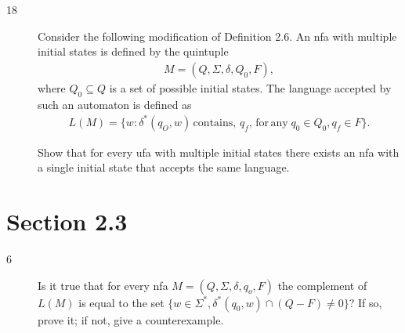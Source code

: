 \documentclass[12pt]{article}
\begin{document}
\begin{description}
    \item[18] Consider the following modification of Definition 2.6. An nfa
        with multiple initial states is defined by the quintuple
        \begin{align*}
            M = (Q, \Sigma, \delta, Q_0, F),
        \end{align*}
        where $Q_0 \subseteq Q$ is a set of possible initial states. The
        language accepted by such an automaton is defined as
        \begin{align*}
            L(M) = \{w: \delta^*(q_O,w)\, \mathrm{contains},\, q_f,\,
                     \mathrm{for\, any}\; q_0 \in Q_0, q_f \in F\}.
        \end{align*}

        Show that for every ufa with multiple initial states there exists an
        nfa with a single initial state that accepts the same language.
\end{description}

\section*{Section 2.3}
\begin{description}
    \item[6] Is it true that for every nfa $M = (Q, \Sigma, \delta, q_o, F)$ the complement of $L(M)$ is
        equal to the set $\{w \in \Sigma^*, \delta^*(q_0, w) \cap (Q - F) \ne 0\}$? If so, prove it; if not,
        give a counterexample.
\end{description}
\end{document}
